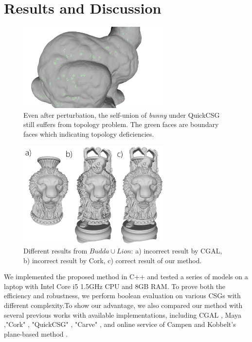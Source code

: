 \documentclass[10pt,journal,compsoc]{IEEEtran}
\begin{document}
\fi

\section{Results and Discussion}


\begin{figure}[t]
\centering
\includegraphics[width=3in]{perturb}
\caption{Even after perturbation, the self-union of \emph{bunny} under QuickCSG still suffers from topology problem. The green faces are boundary faces which indicating topology deficiencies.}
\label{fig:boundaryedge}
\end{figure}

\begin{figure}[t]
\centering
\includegraphics[width=3in]{buddalion}
\caption{ Different results from $Budda\cup Lion$: a) incorrect result by CGAL, b) incorrect result by Cork, c) correct result of our method. }
\label{fig:buddalion}
\end{figure}

We implemented the proposed method in C++ and tested a series of models on a laptop with Intel Core i5 1.5GHz CPU and 8GB RAM. To prove both the efficiency and robustness, we perform boolean evaluation on various CSGs with different complexity.To show our advantage, we also compared our method with several previous works with available implementations, including CGAL \cite{cgal:hk-bonp3-15a}, Maya \cite{Maya2015,barki2015exact},"Cork" \cite{Cork}, "QuickCSG" \cite{douze2015quickcsg}, "Carve" \cite{Carve}, and online service of Campen and Kobbelt's plane-based method \cite{campen2010exact,WebBSP}.
\end{document}
